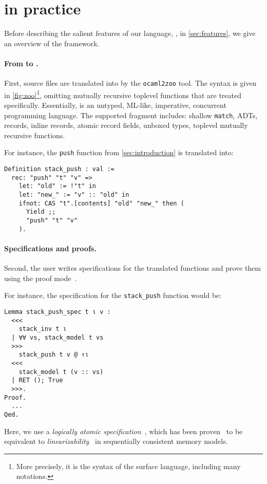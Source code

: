 \section{\Zoo in practice}
\label{sec:zoo}



Before describing the salient features of our language, \Zoo, in \cref{sec:features}, we give an overview of the framework.

\paragraph{From \OCaml to \Zoo.}

First, \OCaml source files are translated into \Zoo by the \texttt{ocaml2zoo} tool.
The \Zoo syntax is given in \cref{fig:zoo}\footnote{More precisely, it is the syntax of the surface language, including many \Coq notations.}, omitting mutually recursive toplevel functions that are treated specifically.
Essentially, \Zoo is an untyped, ML-like, imperative, concurrent programming language.
The supported \OCaml fragment includes: shallow \texttt{match}, ADTs, records, inline records, atomic record fields, unboxed types, toplevel mutually recursive functions.


For instance, the \texttt{push} function from \cref{sec:introduction} is translated into:

\begin{verbatim}
Definition stack_push : val :=
  rec: "push" "t" "v" =>
    let: "old" := !"t" in
    let: "new_" := "v" :: "old" in
    ifnot: CAS "t".[contents] "old" "new_" then (
      Yield ;;
      "push" "t" "v"
    ).
\end{verbatim}

\paragraph{Specifications and proofs.}

Second, the user writes specifications for the translated functions and prove them using the \Iris proof mode~\cite{DBLP:journals/pacmpl/KrebbersJ0TKTCD18}.

For instance, the specification for the \texttt{stack_push} function would be:

\begin{verbatim}
Lemma stack_push_spec t ι v :
  <<<
    stack_inv t ι
  | ∀∀ vs, stack_model t vs
  >>>
    stack_push t v @ ↑ι
  <<<
    stack_model t (v :: vs)
  | RET (); True
  >>>.
Proof.
  ...
Qed.
\end{verbatim}

Here, we use a \emph{logically atomic specification}~\cite{DBLP:conf/ecoop/PintoDG14}, which has been proven~\cite{DBLP:journals/pacmpl/BirkedalDGJST21} to be equivalent to \emph{linearizability}~\cite{DBLP:journals/toplas/HerlihyW90} in sequentially consistent memory models.
